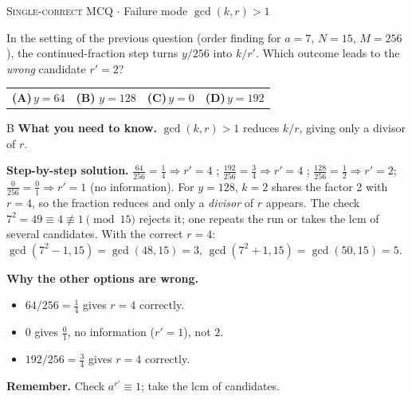 \documentclass[11pt,a4paper]{article}
\newcommand{\optlabel}[1]{\textbf{(#1)}}
\newcommand{\correctlabel}[1]{\textcolor{okgreen}{\textbf{(#1)}\,\ding{51}}}
\newenvironment{qitem}[1]{\begin{list}{}{\setlength{\leftmargin}{3.3em}\setlength{\labelwidth}{3.1em}%
  \setlength{\labelsep}{0.2em}\setlength{\topsep}{3pt}\setlength{\parsep}{3pt}}\item[\textbf{Q.#1}\hfill]}{\end{list}}
\newcommand{\qsep}{\par\vspace{2pt}{\color{black!15}\hrule}\vspace{4pt}}
\newcommand{\qmeta}[2]{{\footnotesize\color{black!60}\textsc{#1} \;$\cdot$\; #2}\par}
\begin{document}
\begin{qitem}{70}
\qmeta{Single-correct MCQ}{Failure mode $\gcd(k, r) > 1$}
In the setting of the previous question (order finding for $a = 7$, $N = 15$, $M = 256$), the continued-fraction step
turns $y/256$ into $k/r'$. Which outcome leads to the \emph{wrong} candidate $r' = 2$?
\par\smallskip\noindent\begin{tabularx}{\linewidth}{@{}*{4}{L}@{}}
\optlabel{A}\,$y = 64$ & \correctlabel{B}\,$y = 128$ & \optlabel{C}\,$y = 0$ & \optlabel{D}\,$y = 192$
\end{tabularx}
\end{qitem}
\begin{solbox}{B}
\textbf{\color{brand}What you need to know.} $\gcd(k, r) > 1$ reduces $k/r$, giving only a divisor of $r$.

\textbf{\color{brand}Step-by-step solution.} $\frac{64}{256} = \frac14 \Rightarrow r' = 4$ \checkmark; $\frac{192}{256} = \frac34 \Rightarrow r' = 4$ \checkmark;
$\frac{128}{256} = \frac12 \Rightarrow r' = 2$; $\frac{0}{256} = \frac01 \Rightarrow r' = 1$ (no information).
For $y = 128$, $k = 2$ shares the factor 2 with $r = 4$, so the fraction reduces and only a \emph{divisor} of $r$ appears.
The check $7^2 = 49 \equiv 4 \not\equiv 1 \pmod{15}$ rejects it; one repeats the run or takes the lcm of several candidates.
With the correct $r = 4$: $\gcd(7^2 - 1, 15) = \gcd(48, 15) = 3$, $\gcd(7^2 + 1, 15) = \gcd(50, 15) = 5$.

\textbf{\color{brand}Why the other options are wrong.}
\begin{itemize}[leftmargin=2.4em, itemsep=1pt, topsep=2pt]
\item[\textbf{(A)}] $64/256 = \frac14$ gives $r = 4$ correctly.
\item[\textbf{(C)}] $0$ gives $\frac01$, no information ($r' = 1$), not $2$.
\item[\textbf{(D)}] $192/256 = \frac34$ gives $r = 4$ correctly.
\end{itemize}
\textbf{\color{brand}Remember.} Check $a^{r'} \equiv 1$; take the lcm of candidates.
\end{solbox}
\qsep
\end{document}
